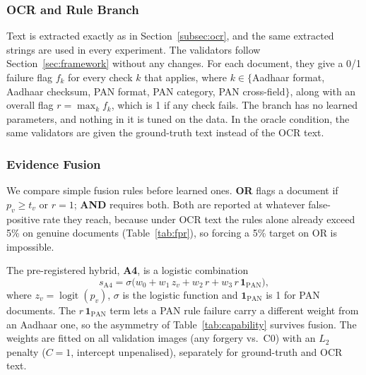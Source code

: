 \documentclass[12pt]{article}
\begin{document}
\subsubsection{OCR and Rule Branch}

Text is extracted exactly as in Section~\ref{subsec:ocr}, and the same extracted strings are used in every experiment. The validators follow Section~\ref{sec:framework} without any changes. For each document, they give a 0/1 failure flag $f_k$ for every check $k$ that applies, where $k \in \{$Aadhaar format, Aadhaar checksum, PAN format, PAN category, PAN cross-field$\}$, along with an overall flag $r = \max_k f_k$, which is 1 if any check fails. The branch has no learned parameters, and nothing in it is tuned on the data. In the oracle condition, the same validators are given the ground-truth text instead of the OCR text.

\subsubsection{Evidence Fusion}
\label{sec:fusion}

We compare simple fusion rules before learned ones. \textbf{OR} flags a
document if $p_v \ge t_v$ or $r=1$; \textbf{AND} requires both. Both are
reported at whatever false-positive rate they reach, because under OCR
text the rules alone already exceed 5\% on genuine documents
(Table~\ref{tab:fpr}), so forcing a 5\% target on OR is impossible.

The pre-registered hybrid, \textbf{A4}, is a logistic combination
\begin{equation}
\label{eq:a4}
s_{\mathrm{A4}} = \sigma\big(w_0 + w_1\,z_v + w_2\,r + w_3\,r\,\mathbf{1}_{\mathrm{PAN}}\big),
\end{equation}
where $z_v=\operatorname{logit}(p_v)$, $\sigma$ is the logistic function
and $\mathbf{1}_{\mathrm{PAN}}$ is 1 for PAN documents. The
$r\,\mathbf{1}_{\mathrm{PAN}}$ term lets a PAN rule failure carry
a different weight from an Aadhaar one, so the asymmetry of
Table~\ref{tab:capability} survives fusion. The weights are fitted on
all validation images (any forgery vs.\ C0) with an $L_2$ penalty
($C=1$, intercept unpenalised), separately for ground-truth and OCR
text.
\end{document}
